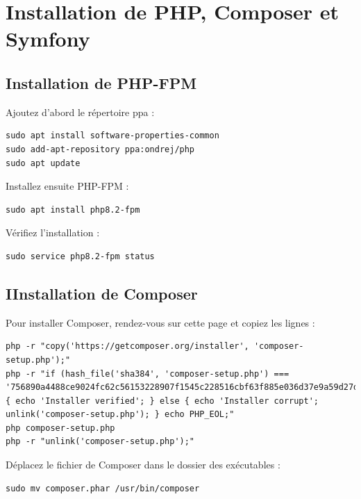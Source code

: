 \documentclass{article}
\begin{document}
\section{Installation de PHP, Composer et Symfony}
\subsection{Installation de PHP-FPM}
Ajoutez d'abord le répertoire ppa :
\begin{verbatim}
sudo apt install software-properties-common
sudo add-apt-repository ppa:ondrej/php
sudo apt update
\end{verbatim}

Installez ensuite PHP-FPM :
\begin{verbatim}
sudo apt install php8.2-fpm
\end{verbatim}

Vérifiez l'installation :
\begin{verbatim}
sudo service php8.2-fpm status
\end{verbatim}

\subsection{IInstallation de Composer}
Pour installer Composer, rendez-vous sur cette page et copiez les lignes :
\begin{verbatim}
php -r "copy('https://getcomposer.org/installer', 'composer-setup.php');"
php -r "if (hash_file('sha384', 'composer-setup.php') === '756890a4488ce9024fc62c56153228907f1545c228516cbf63f885e036d37e9a59d27d63f46af1d4d07ee0f76181c7d3') { echo 'Installer verified'; } else { echo 'Installer corrupt'; unlink('composer-setup.php'); } echo PHP_EOL;"
php composer-setup.php
php -r "unlink('composer-setup.php');"
\end{verbatim}

Déplacez le fichier de Composer dans le dossier des exécutables :
\begin{verbatim}
sudo mv composer.phar /usr/bin/composer
\end{verbatim}
\end{document}
